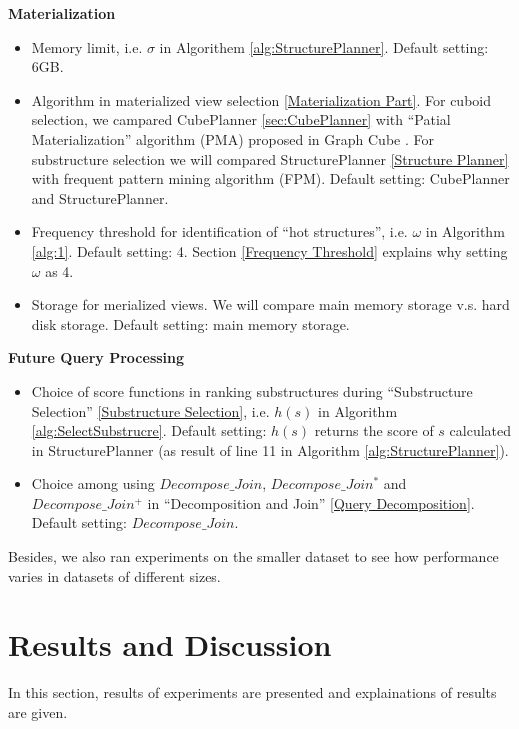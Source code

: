 \textbf{Materialization}
\begin{itemize}

\item  Memory limit, i.e. $\sigma$ in Algorithem \ref{alg:StructurePlanner}. Default setting: 6GB.

\item  Algorithm in materialized view selection \ref{Materialization Part}. For cuboid selection, we  campared CubePlanner \ref{sec:CubePlanner} with ``Patial Materialization'' algorithm (PMA) proposed in Graph Cube \cite{DBLP:conf/sigmod/ZhaoLXH11}. For substructure selection we will compared StructurePlanner \ref{Structure Planner} with frequent pattern mining algorithm (FPM). Default setting: CubePlanner and StructurePlanner.

\item Frequency threshold for identification of “hot structures”, i.e. $\omega$ in Algorithm \ref{alg:1}. Default setting: 4. Section \ref{Frequency Threshold} explains why setting $\omega$ as 4. 

\item Storage for merialized views. We will compare main memory storage v.s. hard disk storage. Default setting: main memory storage.

\end{itemize}

\textbf{Future Query Processing}
\begin{itemize}
\item  Choice of score functions in ranking substructures during ``Substructure Selection'' \ref{Substructure Selection}, i.e. $h(s)$ in Algorithm \ref{alg:SelectSubstrucre}. Default setting: $h(s)$ returns the score of $s$ calculated in StructurePlanner (as result of line 11 in Algorithm \ref{alg:StructurePlanner}). 

\item  Choice among using $Decompose\_Join$, $Decompose\_Join^{*}$ and $Decompose\_Join^{+}$ in ``Decomposition and Join'' \ref{Query Decomposition}. Default setting: $Decompose\_Join$.

\end{itemize}

Besides, we also ran experiments on the smaller dataset to see how performance varies in datasets of different sizes.  

\section{Results and Discussion}
\label{Results and Discussion}
In this section, results of experiments are presented and explainations of results are given. 

